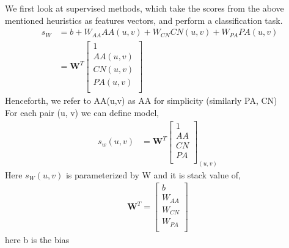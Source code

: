\documentclass{article}
\begin{document}
We first look at supervised methods, which take the scores from the above mentioned heuristics as features vectors, and perform a classification task.
\begin{equation} \
\begin{split}
s_W & = b + W_{AA} AA(u, v) + W_{CN} CN(u, v) + W_{PA} PA(u, v) \\
 & = \textbf{W}^T \begin{bmatrix}
1 \\
AA(u, v)\\
CN(u, v)\\
PA(u, v)\\
\end{bmatrix}\
\end{split}
\end{equation}
Henceforth, we refer to AA(u,v) as AA for simplicity (similarly PA, CN) \\
         For each pair (u, v) we can define model,
         \begin{equation} \label{}
\begin{split}
s_w(u, v)  & = \textbf{W}^T \begin{bmatrix}
1\\
AA\\
CN\\
PA\\
\end{bmatrix}_{(u, v)}\
\end{split}
\end{equation}
Here $s_W(u, v)$ is parameterized by W and it is stack value of,
   \begin{equation} \label{}
\begin{split}
 \textbf{W}^T =  \begin{bmatrix}
b \\
W_{AA}\\
W_{CN}\\
W_{PA}\\
\end{bmatrix}\
\end{split}
\end{equation} 
\hspace{4in} here b is the bias\\
\end{document}
